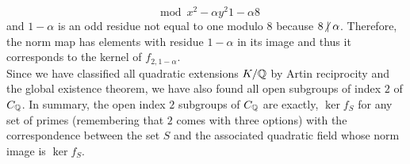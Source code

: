 \documentclass[12pt]{extarticle}
\begin{document}
\[ \mod{x^2 - \alpha y^2}{1 - \alpha}{8} \]
and $1 - \alpha$ is an odd residue not equal to one modulo $8$ because $8 \ndivides \alpha$. Therefore, the norm map has elements with residue $1 - \alpha$ in its image and thus it corresponds to the kernel of $f_{2,1 - \alpha}$.  
\bigskip\\
Since we have classified all quadratic extensions $K / \mathbb{Q}$ by Artin reciprocity and the global existence theorem, we have also found all open subgroups of index $2$ of $C_{\mathbb{Q}}$. In summary, the open index $2$ subgroups of $C_{\mathbb{Q}}$ are exactly, $\ker{f_S}$ for any set of primes (remembering that $2$ comes with three options) with the correspondence between the set $S$ and the associated quadratic field whose norm image is $\ker{f_S}$. 

\section{} 
\end{document}
